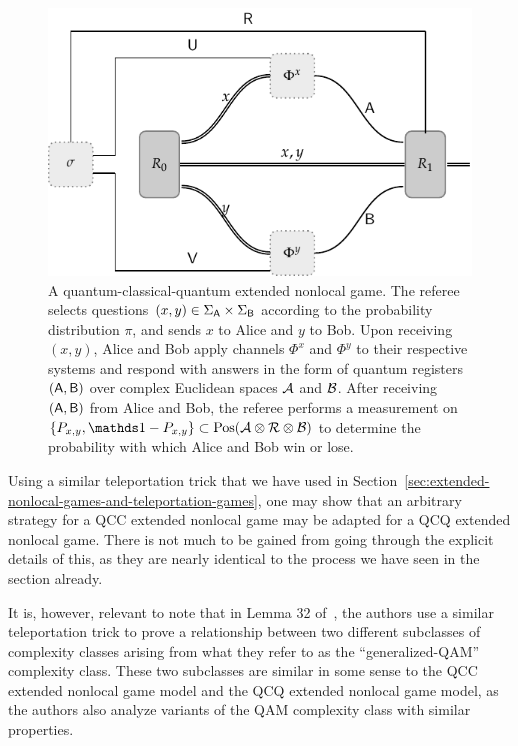 \begin{figure}[!htpb] 
	\begin{center}
			\includegraphics[scale=1.0]{figures/qcq_enlg.pdf}
	\end{center}
		\caption[A quantum-classical-quantum extended nonlocal game.]{A quantum-classical-quantum extended nonlocal game. The referee selects questions $(x,y) \in \Sigma_{\mathsf{A}} \times \Sigma_{\mathsf{B}}$ according to the probability distribution $\pi$, and sends $x$ to Alice and $y$ to Bob. Upon receiving $(x,y)$, Alice and Bob apply channels $\Phi^x$ and $\Phi^y$ to their respective systems and respond with answers in the form of quantum registers $(\mathsf{A},\mathsf{B})$ over complex Euclidean spaces $\mathcal{A}$ and $\mathcal{B}$. After receiving $(\mathsf{A},\mathsf{B})$ from Alice and Bob, the referee performs a measurement on $\{P_{x,y}, \I - P_{x,y}\}\subset \Pos(\A \otimes \R \otimes \B)$ to determine the probability with which Alice and Bob win or lose.}
		\label{fig:quantum-classical-quantum-enlg}
\end{figure}
Using a similar teleportation trick that we have used in Section~\ref{sec:extended-nonlocal-games-and-teleportation-games}, one may show that an arbitrary strategy for a QCC extended nonlocal game may be adapted for a QCQ extended nonlocal game. There is not much to be gained from going through the explicit details of this, as they are nearly identical to the process we have seen in the section already.

It is, however, relevant to note that in Lemma 32 of~\cite{Kobayashi2015}, the authors use a similar teleportation trick to prove a relationship between two different subclasses of complexity classes arising from what they refer to as the ``generalized-QAM'' complexity class. These two subclasses are similar in some sense to the QCC extended nonlocal game model and the QCQ extended nonlocal game model, as the authors also analyze variants of the QAM complexity class with similar properties.  

